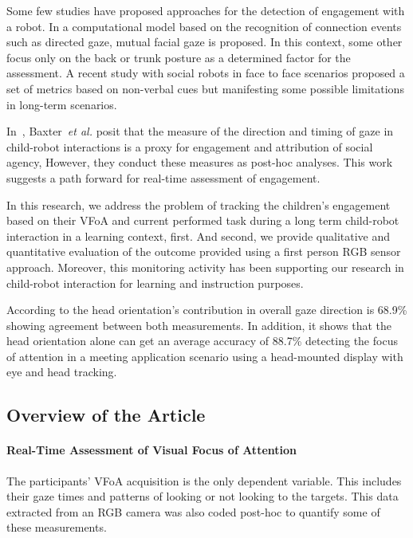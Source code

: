 \documentclass{sig-alternate}
\newcommand{\etal}{\textit{et al.}\xspace}
\begin{document}
Some few studies have proposed approaches for the detection of engagement with a
robot. In \cite{Rich:2010} a computational model based on the recognition of
connection events such as directed gaze, mutual facial gaze is proposed. In this
context, some other \cite{Sanghvi:2011} focus only on the back or trunk posture
as a determined factor for the assessment. A recent study \cite{anzalone} with
social robots in face to face scenarios proposed a set of metrics based on
non-verbal cues but manifesting some possible limitations in long-term
scenarios.

In~\cite{baxter2014tracking}, Baxter~\etal posit that the measure of the
direction and timing of gaze in child-robot interactions is a proxy for
engagement and attribution of social agency, However, they conduct these
measures as post-hoc analyses. This work suggests a path forward for real-time
assessment of engagement.

In this research, we address the problem of tracking the children's engagement
based on their VFoA and current performed task during a long term child-robot
interaction in a learning context, first. And second, we provide qualitative and
quantitative evaluation of the outcome provided using a first person RGB sensor
approach. Moreover, this monitoring activity has been supporting our research in
child-robot interaction for learning and instruction purposes.


According to \cite{stiefelhagen2002tracking} the head orientation's contribution
in overall gaze direction is 68.9\% showing agreement between both measurements.
In addition, it shows that the head orientation alone can get an average
accuracy of 88.7\% detecting the focus of attention in a meeting application
scenario using a head-mounted display with eye and head tracking.


\subsection*{Overview of the Article}

\paragraph{Real-Time Assessment of Visual Focus of Attention}

The participants' VFoA acquisition is the only dependent variable. This includes
their gaze times and patterns of looking or not looking to the targets. This
data extracted from an RGB camera was also coded post-hoc to quantify some of
these measurements.
\end{document}
